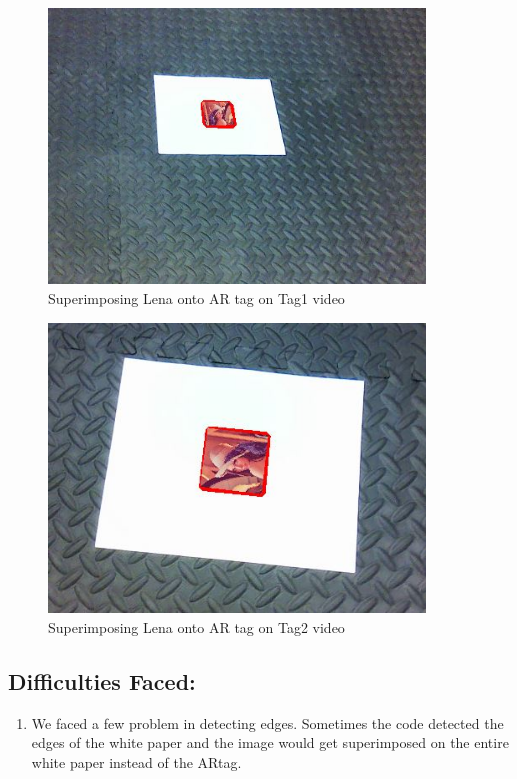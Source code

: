 \documentclass[12pt]{article}
\begin{document}
\begin{enumerate}
\begin{figure}[h]
    \centering
    \includegraphics[width=10cm]{Tag1_videooutput}
    \caption{Superimposing Lena onto AR tag on Tag1 video}
    \label{fig:video frame output}
\end{figure}
\newpage
\begin{figure}[h]
    \centering
    \includegraphics[width=10cm]{Tag2_videooutput}
    \caption{Superimposing Lena onto AR tag on Tag2 video}
    \label{fig:video frame output}
\end{figure}
\end{enumerate}
\subsection{Difficulties Faced:}
\begin{enumerate}
\item We faced a few problem in detecting edges. Sometimes the code detected the edges of the white paper and the image would get superimposed on the entire white paper instead of the ARtag.
\end{enumerate}
\newpage
\end{document}
